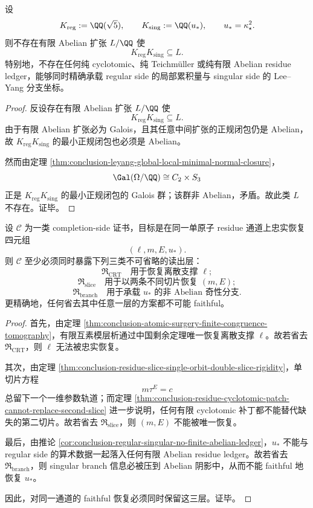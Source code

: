 \begin{corollary}\label{cor:conclusion-regular-singular-no-finite-abelian-ledger}
设
\[
K_{\mathrm{reg}}:=\QQ(\sqrt5),
\qquad
K_{\mathrm{sing}}:=\QQ(u_\ast),
\qquad
u_\ast=\kappa_\star^2.
\]
则不存在有限 Abelian 扩张 \(L/\QQ\) 使
\[
K_{\mathrm{reg}}K_{\mathrm{sing}}\subseteq L.
\]
特别地，不存在任何纯 cyclotomic、纯 Teichm\"uller 或纯有限 Abelian residue ledger，能够同时精确承载 regular side 的局部累积量与 singular side 的 Lee--Yang 分支坐标。
\end{corollary}
\begin{proof}
反设存在有限 Abelian 扩张 \(L/\QQ\) 使
\[
K_{\mathrm{reg}}K_{\mathrm{sing}}\subseteq L.
\]
由于有限 Abelian 扩张必为 Galois，且其任意中间扩张的正规闭包仍是 Abelian，故 \(K_{\mathrm{reg}}K_{\mathrm{sing}}\) 的最小正规闭包也必须是 Abelian。

然而由定理 \ref{thm:conclusion-leyang-global-local-minimal-normal-closure}，
\[
\Gal(\Omega/\QQ)\cong C_2\times S_3
\]
正是 \(K_{\mathrm{reg}}K_{\mathrm{sing}}\) 的最小正规闭包的 Galois 群；该群非 Abelian，矛盾。故此类 \(L\) 不存在。证毕。
\end{proof}

\begin{theorem}\label{thm:conclusion-completion-faithful-certificate-three-register-split}
设 \(\mathcal C\) 为一类 completion-side 证书，目标是在同一单原子 residue 通道上忠实恢复四元组
\[
(\ell,m,E,u_\ast).
\]
则 \(\mathcal C\) 至少必须同时暴露下列三类不可省略的读出层：
\[
\mathfrak R_{\mathrm{CRT}}
\quad\text{用于恢复离散支撑 }\ell;
\]
\[
\mathfrak R_{\mathrm{slice}}
\quad\text{用于以两条不同切片恢复 }(m,E);
\]
\[
\mathfrak R_{\mathrm{branch}}
\quad\text{用于承载 }u_\ast\text{ 的非 Abelian 奇性分支}.
\]
更精确地，任何省去其中任意一层的方案都不可能 faithful。
\end{theorem}
\begin{proof}
首先，由定理 \ref{thm:conclusion-atomic-surgery-finite-congruence-tomography}，有限互素模层析通过中国剩余定理唯一恢复离散支撑 \(\ell\)。故若省去 \(\mathfrak R_{\mathrm{CRT}}\)，则 \(\ell\) 无法被忠实恢复。

其次，由定理 \ref{thm:conclusion-residue-slice-single-orbit-double-slice-rigidity}，单切片方程
\[
m\tau^E=c
\]
总留下一个一维参数轨道；而定理 \ref{thm:conclusion-residue-cyclotomic-patch-cannot-replace-second-slice} 进一步说明，任何有限 cyclotomic 补丁都不能替代缺失的第二切片。故若省去 \(\mathfrak R_{\mathrm{slice}}\)，则 \((m,E)\) 不能被唯一恢复。

最后，由推论 \ref{cor:conclusion-regular-singular-no-finite-abelian-ledger}，\(u_\ast\) 不能与 regular side 的算术数据一起落入任何有限 Abelian residue ledger。故若省去 \(\mathfrak R_{\mathrm{branch}}\)，则 singular branch 信息必被压到 Abelian 阴影中，从而不能 faithful 地恢复 \(u_\ast\)。

因此，对同一通道的 faithful 恢复必须同时保留这三层。证毕。
\end{proof}

